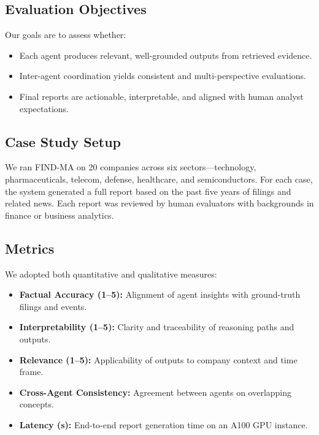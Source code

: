 \documentclass[11pt]{article}
\newcommand{\findma}{\textsc{FIND-MA}}
\begin{document}
\subsection*{Evaluation Objectives}
Our goals are to assess whether:
\begin{itemize}
    \item Each agent produces relevant, well-grounded outputs from retrieved evidence.
    \item Inter-agent coordination yields consistent and multi-perspective evaluations.
    \item Final reports are actionable, interpretable, and aligned with human analyst expectations.
\end{itemize}

\subsection*{Case Study Setup}
We ran \findma{} on 20 companies across six sectors—technology, pharmaceuticals, telecom, defense, healthcare, and semiconductors. For each case, the system generated a full report based on the past five years of filings and related news. Each report was reviewed by human evaluators with backgrounds in finance or business analytics.

\subsection*{Metrics}
We adopted both quantitative and qualitative measures:
\begin{itemize}
    \item \textbf{Factual Accuracy (1–5):} Alignment of agent insights with ground-truth filings and events.
    \item \textbf{Interpretability (1–5):} Clarity and traceability of reasoning paths and outputs.
    \item \textbf{Relevance (1–5):} Applicability of outputs to company context and time frame.
    \item \textbf{Cross-Agent Consistency:} Agreement between agents on overlapping concepts.
    \item \textbf{Latency (s):} End-to-end report generation time on an A100 GPU instance.
\end{itemize}
\end{document}
